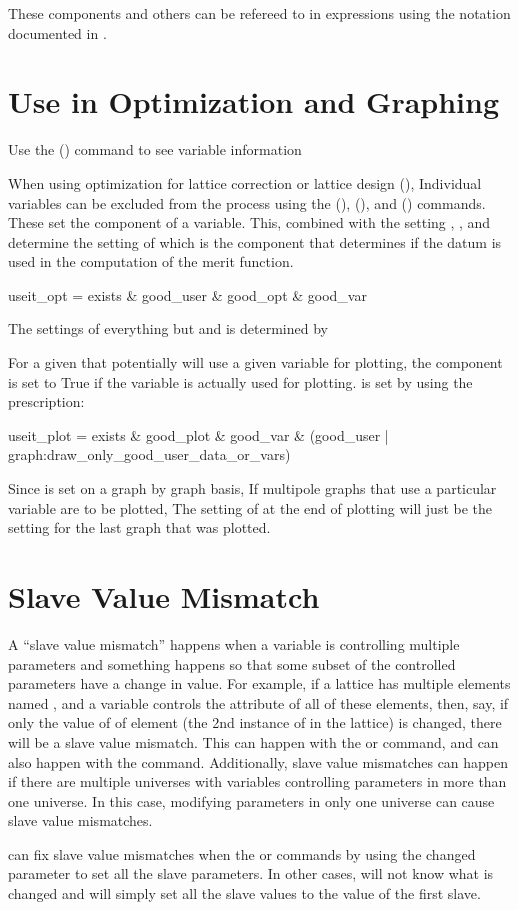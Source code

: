 These components and others can be refereed to in expressions using the notation documented
in .

\section{Use in Optimization and Graphing}
\label{s:var.use}

Use the  () command to see variable information

When using optimization for lattice correction or lattice design (), Individual
variables can be excluded from the process using the  (), 
(), and  () commands. These set the  component of
a variable. This, combined with the setting , , and  determine
the setting of  which is the component that determines if the datum is used in the
computation of the merit function.
\begin{example}
  useit_opt = exists \& good_user \& good_opt \& good_var
\end{example}
The settings of everything but  and  is determined by \tao

For a given  that potentially will use a given variable for plotting, 
the  component is set to True if the variable is actually used for plotting.
 is set by \tao using the prescription:
\begin{example}
  useit_plot = exists \& good_plot \& good_var \& 
                            (good_user | graph:draw_only_good_user_data_or_vars)
\end{example}
Since  is set on a graph by graph basis, If multipole graphs that use a particular
variable are to be plotted, The setting of  at the end of plotting will just be
the setting for the last graph that was plotted.

\section{Slave Value Mismatch}
\label{s:var.mismatch}

A ``slave value mismatch'' happens when a variable is controlling multiple parameters and something
happens so that some subset of the controlled parameters have a change in value. For example, if a
lattice has multiple elements named , and a variable controls the  attribute of all
of these elements, then, say, if only the value of  of element  (the 2nd instance
of  in the lattice) is changed, there will be a slave value mismatch. This can happen with the
 or  command, and can also happen with the 
command.  Additionally, slave value mismatches can happen if there are multiple universes with
variables controlling parameters in more than one universe. In this case, modifying parameters in
only one universe can cause slave value mismatches.

\tao can fix slave value mismatches when the  or  commands by using
the changed parameter to set all the slave parameters. In other cases, \tao will not know what is changed
and will simply set all the slave values to the value of the first slave.
